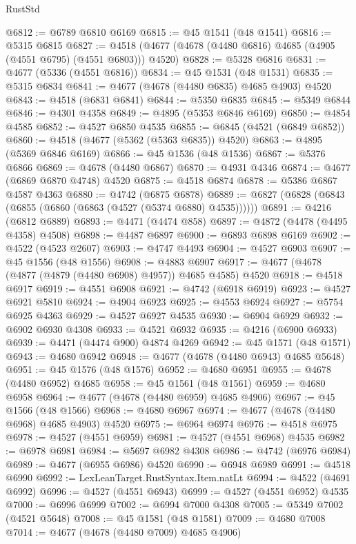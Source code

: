 \begin{lexlean}{RustStd}
\begin{coremodule}
@6812 := @6789 @6810 @6169
@6815 := @45 @1541 (@48 @1541)
@6816 := @5315 @6815
@6827 := @4518 (@4677 (@4678 (@4480 @6816) @4685 (@4905 (@4551 @6795) (@4551 @6803))) @4520)
@6828 := @5328 @6816
@6831 := @4677 (@5336 (@4551 @6816))
@6834 := @45 @1531 (@48 @1531)
@6835 := @5315 @6834
@6841 := @4677 (@4678 (@4480 @6835) @4685 @4903) @4520
@6843 := @4518 (@6831 @6841)
@6844 := @5350 @6835
@6845 := @5349 @6844
@6846 := @4301 @4358
@6849 := @4895 (@5353 @6846 @6169)
@6850 := @4854 @4585
@6852 := @4527 @6850 @4535
@6855 := @6845 (@4521 (@6849 @6852))
@6860 := @4518 (@4677 (@5362 (@5363 @6835)) @4520)
@6863 := @4895 (@5369 @6846 @6169)
@6866 := @45 @1536 (@48 @1536)
@6867 := @5376 @6866
@6869 := @4678 (@4480 @6867)
@6870 := @4931 @4346
@6874 := @4677 (@6869 @6870 @4748) @4520
@6875 := @4518 @6874
@6878 := @5386 @6867 @4587 @4363
@6880 := @4742 (@6875 @6878)
@6889 := @6827 (@6828 (@6843 (@6855 (@6860 (@6863 (@4527 (@5374 @6880) @4535))))))
@6891 := @4216 (@6812 @6889)
@6893 := @4471 (@4474 @858)
@6897 := @4872 (@4478 (@4495 @4358) @4508)
@6898 := @4487 @6897
@6900 := @6893 @6898 @6169
@6902 := @4522 (@4523 @2607)
@6903 := @4747 @4493
@6904 := @4527 @6903
@6907 := @45 @1556 (@48 @1556)
@6908 := @4883 @6907
@6917 := @4677 (@4678 (@4877 (@4879 (@4480 @6908) @4957)) @4685 @4585) @4520
@6918 := @4518 @6917
@6919 := @4551 @6908
@6921 := @4742 (@6918 @6919)
@6923 := @4527 @6921 @5810
@6924 := @4904 @6923
@6925 := @4553 @6924
@6927 := @5754 @6925 @4363
@6929 := @4527 @6927 @4535
@6930 := @6904 @6929
@6932 := @6902 @6930 @4308
@6933 := @4521 @6932
@6935 := @4216 (@6900 @6933)
@6939 := @4471 (@4474 @900) @4874 @4269
@6942 := @45 @1571 (@48 @1571)
@6943 := @4680 @6942
@6948 := @4677 (@4678 (@4480 @6943) @4685 @5648)
@6951 := @45 @1576 (@48 @1576)
@6952 := @4680 @6951
@6955 := @4678 (@4480 @6952) @4685
@6958 := @45 @1561 (@48 @1561)
@6959 := @4680 @6958
@6964 := @4677 (@4678 (@4480 @6959) @4685 @4906)
@6967 := @45 @1566 (@48 @1566)
@6968 := @4680 @6967
@6974 := @4677 (@4678 (@4480 @6968) @4685 @4903) @4520
@6975 := @6964 @6974
@6976 := @4518 @6975
@6978 := @4527 (@4551 @6959)
@6981 := @4527 (@4551 @6968) @4535
@6982 := @6978 @6981
@6984 := @5697 @6982 @4308
@6986 := @4742 (@6976 @6984)
@6989 := @4677 (@6955 @6986) @4520
@6990 := @6948 @6989
@6991 := @4518 @6990
@6992 := LexLeanTarget.RustSyntax.Item.natLt
@6994 := @4522 (@4691 @6992)
@6996 := @4527 (@4551 @6943)
@6999 := @4527 (@4551 @6952) @4535
@7000 := @6996 @6999
@7002 := @6994 @7000 @4308
@7005 := @5349 @7002 (@4521 @5648)
@7008 := @45 @1581 (@48 @1581)
@7009 := @4680 @7008
@7014 := @4677 (@4678 (@4480 @7009) @4685 @4906)

\end{coremodule}
\end{lexlean}
